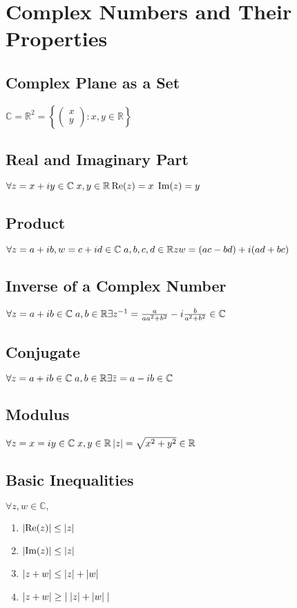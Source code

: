 \section{Complex Numbers and Their Properties}
\subsection*{Complex Plane as a Set}
$\mathbb{C} = \mathbb{R}^2 = \left\{\begin{pmatrix} x \\ y \end{pmatrix} : x, y \in \mathbb{R} \right\}$
\subsection*{Real and Imaginary Part}
$\forall z = x + iy \in \mathbb{C} \; x, y \in \mathbb{R} \\ \operatorname{Re}(z) = x \; \operatorname{Im}(z) = y$
\subsection*{Product}
$\forall z = a + ib, w = c + id \in \mathbb{C} \; a, b, c, d \in \mathbb{R} \\
zw = (ac - bd) + i (ad + bc)$
\subsection*{Inverse of a Complex Number}
$\forall z = a + ib \in \mathbb{C} \; a, b \in \mathbb{R} \\
\exists z^{-1} = \frac{a}{aa^2 + b^2} - i \frac{b}{a^2 + b^2} \in \mathbb{C}$
\subsection*{Conjugate}
$\forall z = a + ib \in \mathbb{C} \; a, b \in \mathbb{R} \\
\exists \bar{z} = a - ib \in \mathbb{C}$
\subsection*{Modulus}
$\forall z = x = iy \in \mathbb{C} \; x, y \in \mathbb{R} \\
\left|z\right| = \sqrt{x^2 + y^2} \in \mathbb{R}$
\subsection*{Basic Inequalities}
$\forall z, w \in \mathbb{C},$
\begin{enumerate}
	\item $\left|\operatorname{Re}(z)\right| \leq \left|z\right|$
	\item $\left|\operatorname{Im}(z)\right| \leq \left|z\right|$
	\item $\left|z + w\right| \leq \left|z\right| + \left|w\right|$
	\item $\left|z + w\right| \geq \left| \; \left|z\right| + \left|w\right| \; \right|$
\end{enumerate}
